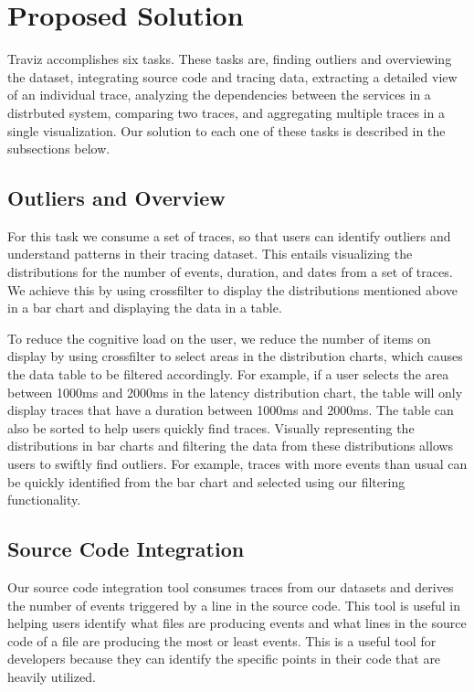 \section{Proposed Solution}

Traviz accomplishes six tasks. These tasks are, finding outliers and overviewing the dataset, 
integrating source code and tracing data, extracting a detailed view of an individual trace, analyzing the
dependencies between the services in a distrbuted system, comparing two traces, and aggregating multiple traces
in a single visualization. Our solution to each one of these tasks is described in the subsections below.

\subsection{Outliers and Overview}

For this task we consume a set of traces, so that users can identify outliers and understand patterns
in their tracing dataset. This entails visualizing the distributions for the number of events, duration, 
and dates from a set of traces. We achieve this by
using crossfilter to display the distributions mentioned above in a bar chart and displaying the data in a table. 

To reduce the cognitive load on the user, we reduce the number of items on display by using crossfilter
to select areas in the distribution charts, which causes the data table to be filtered accordingly. For example,
if a user selects the area between 1000ms and 2000ms in the latency distribution chart, the table will only display
traces that have a duration between 1000ms and 2000ms. The table can also be sorted to help users quickly find traces. 
Visually representing the distributions in bar charts and filtering the data from these distributions allows users to swiftly
find outliers. For example, traces with more events than usual can be quickly identified from the bar chart and selected using our
filtering functionality.

\subsection{Source Code Integration}

Our source code integration tool consumes traces from our datasets and derives the number of events
triggered by a line in the source code. This tool is useful in helping users identify what files are producing events
and what lines in the source code of a file are producing the most or least events. This is a useful tool for developers because
they can identify the specific points in their code that are heavily utilized. 


